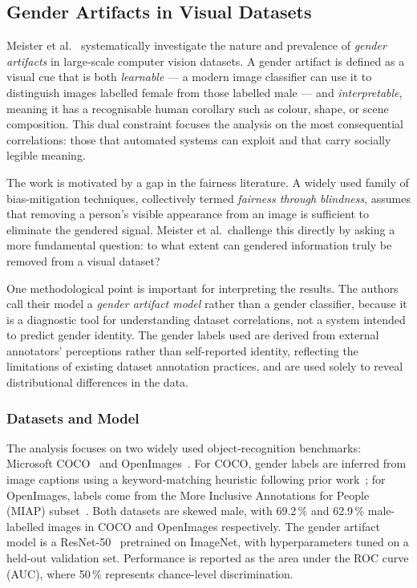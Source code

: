 \subsection*{Gender Artifacts in Visual Datasets}
\label{subsec:meister2023}

Meister et al.~\cite{Meister_2023_GenderArtifactsinVisualDatasets} systematically
investigate the nature and prevalence of \emph{gender artifacts} in large-scale computer
vision datasets.  A gender artifact is defined as a visual cue that is both \emph{learnable}
--- a modern image classifier can use it to distinguish images labelled female from those
labelled male --- and \emph{interpretable}, meaning it has a recognisable human corollary
such as colour, shape, or scene composition.  This dual constraint focuses the analysis on
the most consequential correlations: those that automated systems can exploit and that carry
socially legible meaning.

The work is motivated by a gap in the fairness literature.  A widely used family of
bias-mitigation techniques, collectively termed \emph{fairness through blindness}, assumes
that removing a person's visible appearance from an image is sufficient to eliminate the
gendered signal.  Meister et al.\ challenge this directly by asking a more fundamental
question: to what extent can gendered information truly be removed from a visual dataset?

One methodological point is important for interpreting the results.  The authors call their
model a \emph{gender artifact model} rather than a gender classifier, because it is a
diagnostic tool for understanding dataset correlations, not a system intended to predict
gender identity.  The gender labels used are derived from external annotators' perceptions
rather than self-reported identity, reflecting the limitations of existing dataset annotation
practices, and are used solely to reveal distributional differences in the data.

\subsubsection*{Datasets and Model}

The analysis focuses on two widely used object-recognition benchmarks: Microsoft
COCO~\cite{Lin_2014_COCO} and OpenImages~\cite{Kuznetsova_2020_OpenImagesV4}.  For COCO,
gender labels are inferred from image captions using a keyword-matching heuristic following
prior work~\cite{Zhao_2017_MenAlsoLikeShopping}; for OpenImages, labels come from the More
Inclusive Annotations for People (MIAP) subset~\cite{Schumann_2021_StepInclusivePeopleAnnotations}.
Both datasets are skewed male, with 69.2\,\% and 62.9\,\% male-labelled images in COCO and
OpenImages respectively.  The gender artifact model is a
ResNet-50~\cite{He_2016_DeepResidualLearning} pretrained on ImageNet, with hyperparameters
tuned on a held-out validation set.  Performance is reported as the area under the ROC
curve (AUC), where 50\,\% represents chance-level discrimination.

